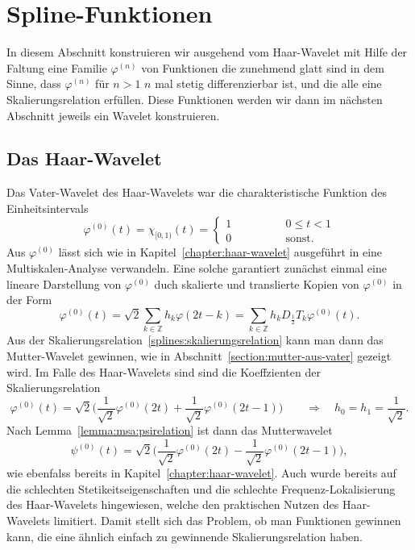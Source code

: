 %
%
%
\section{Spline-Funktionen
\label{section:spline-funktionen}}
In diesem Abschnitt konstruieren wir ausgehend vom Haar-Wavelet mit Hilfe
der Faltung eine Familie $\varphi^{(n)}$ von Funktionen die zunehmend glatt
sind in dem Sinne, dass $\varphi^{(n)}$ für $n>1$ $n$ mal stetig
differenzierbar ist, und die alle eine Skalierungsrelation erfüllen.
Diese Funktionen werden wir dann im nächsten Abschnitt jeweils ein
Wavelet konstruieren.

\subsection{Das Haar-Wavelet
\label{subsection:spline:haar}}
Das Vater-Wavelet des Haar-Wavelets war die charakteristische Funktion
des Einheitsintervals
\begin{equation}
\varphi^{(0)}(t)
=
\chi_{[0,1)}(t)
=
\begin{cases}
1\qquad\qquad&0\le t < 1\\
0\qquad\qquad&\text{sonst}.
\end{cases}
\end{equation}
Aus $\varphi^{(0)}$ lässt sich wie in Kapitel~\ref{chapter:haar-wavelet}
ausgeführt in eine Multiskalen-Analyse verwandeln.
Eine solche garantiert zunächst einmal eine lineare Darstellung von
$\varphi^{(0)}$ duch skalierte und translierte Kopien von $\varphi^{(0)}$
in der Form
\begin{equation}
\varphi^{(0)}(t)
=
\sqrt{2}
\sum_{k\in\mathbb Z}
h_k\varphi(2t-k)
=
\sum_{k\in\mathbb Z}
h_k D_{\frac12}T_k\varphi^{(0)}(t).
\label{splines:skalierungsrelation}
\end{equation}
Aus der Skalierungsrelation~\eqref{splines:skalierungsrelation}
kann man dann das Mutter-Wavelet gewinnen, wie in
Abschnitt~\ref{section:mutter-aus-vater} gezeigt wird.
Im Falle des Haar-Wavelets sind sind die Koeffzienten der
Skalierungsrelation
\[
\varphi^{(0)}(t)
=
\sqrt{2}
\biggl(
\frac1{\sqrt{2}}
\varphi^{(0)}(2t)
+
\frac1{\sqrt{2}}
\varphi^{(0)}(2t-1)
\biggr)
\qquad
\Rightarrow
\quad
h_0 = h_1 = \frac{1}{\sqrt{2}}.
\]
Nach Lemma~\ref{lemma:msa:psirelation} ist dann das Mutterwavelet
\[
\psi^{(0)}(t)
=
\sqrt{2}
\biggl(
\frac{1}{\sqrt{2}}
\varphi^{(0)}(2t)
-
\frac{1}{\sqrt{2}}
\varphi^{(0)}(2t-1)
\biggr),
\]
wie ebenfalss bereits in Kapitel~\ref{chapter:haar-wavelet}.
Auch wurde bereits auf die schlechten Stetikeitseigenschaften und
die schlechte Frequenz-Lokalisierung des Haar-Wavelets hingewiesen,
welche den praktischen Nutzen des Haar-Wavelets limitiert.
Damit stellt sich das Problem, ob man Funktionen gewinnen kann, die
eine ähnlich einfach zu gewinnende Skalierungsrelation haben.

